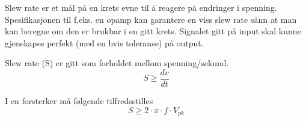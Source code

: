 Slew rate er et mål på en krets evne til å reagere på endringer i spenning.
Spesifikasjonen til f.eks. en opamp kan garantere en viss slew rate sånn at man
kan beregne om den er brukbar i en gitt krets.
Signalet gitt på input skal kunne gjenskapes perfekt (med en hvis toleranse)
på output.

Slew rate (S) er gitt som forholdet mellom spenning/sekund.
$$S \geq \frac{dv}{dt}$$

I en forsterker må følgende tilfredsstilles
$$S \geq 2 \cdot \pi \cdot f \cdot V_{pk}$$
